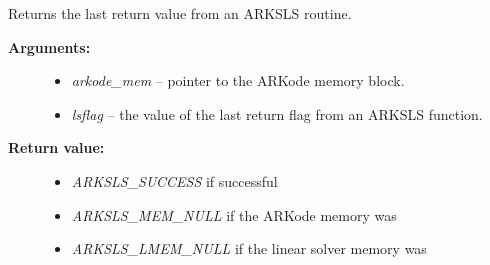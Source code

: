 \documentclass[letterpaper,10pt,english]{sphinxmanual}
\begin{document}
\begin{fulllineitems}
\label{c_interface/User_callable:ARKSlsGetLastFlag}
Returns the last return value from an ARKSLS routine.
\begin{description}
\item[{\textbf{Arguments:}}] \leavevmode\begin{itemize}
\item {} 
\emph{arkode\_mem} -- pointer to the ARKode memory block.

\item {} 
\emph{lsflag} -- the value of the last return flag from an ARKSLS function.

\end{itemize}

\item[{\textbf{Return value:}}] \leavevmode\begin{itemize}
\item {} 
\emph{ARKSLS\_SUCCESS} if successful

\item {} 
\emph{ARKSLS\_MEM\_NULL} if the ARKode memory was 

\item {} 
\emph{ARKSLS\_LMEM\_NULL} if the linear solver memory was 

\end{itemize}

\end{description}

\end{fulllineitems}

\end{document}
